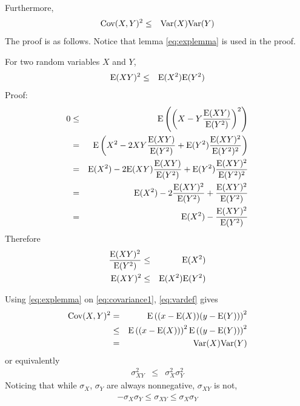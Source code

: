 Furthermore,
\begin{eqnarray}
  \textup{Cov}(X, Y)^2 &\leq& \textup{Var}(X)\textup{Var}(Y) \nonumber
\end{eqnarray}
The proof is as follows. Notice that lemma \eqref{eq:explemma} is used in the proof.
\begin{mdframed}[frametitle={Lemma}]

For two random variables $X$ and $Y$,
\begin{eqnarray}
	\textup{E}(XY)^2 &\leq&  \textup{E}(X^2)\textup{E}(Y^2) \label{eq:explemma}
\end{eqnarray}
\noindent Proof:
\begin{eqnarray}
	0 &\leq& \textup{E}\left(\left(X-Y\dfrac{\textup{E}(XY)}{\textup{E}(Y^2)}\right)^2\right) \nonumber \\
	&=& \textup{E}\left(X^2-2XY\dfrac{\textup{E}(XY)}{\textup{E}(Y^2)}+\textup{E}(Y^2)\dfrac{\textup{E}(XY)^2}{\textup{E}(Y^2)^2}\right) \nonumber \\
	&=& \textup{E}(X^2) - 2\textup{E}(XY)\dfrac{\textup{E}(XY)}{\textup{E}(Y^2)} + \textup{E}(Y^2)\dfrac{\textup{E}(XY)^2}{\textup{E}(Y^2)^2} \nonumber \\
	&=& \textup{E}(X^2) - 2\dfrac{\textup{E}(XY)^2}{\textup{E}(Y^2)} + \dfrac{\textup{E}(XY)^2}{\textup{E}(Y^2)} \nonumber \\
	&=& \textup{E}(X^2) - \dfrac{\textup{E}(XY)^2}{\textup{E}(Y^2)} \nonumber
\end{eqnarray}
Therefore
\begin{eqnarray}
	\dfrac{\textup{E}(XY)^2}{\textup{E}(Y^2)} &\leq& \textup{E}(X^2) \nonumber \\
	\textup{E}(XY)^2 &\leq&  \textup{E}(X^2)\textup{E}(Y^2) \nonumber
\end{eqnarray}
\end{mdframed}
Using \eqref{eq:explemma} on \eqref{eq:covariance1}, \eqref{eq:vardef} gives
\begin{eqnarray}
	\textup{Cov}(X, Y)^2 &=& \textup{E}\left((x - \textup{E}(X))(y - \textup{E}(Y))\right)^2 \nonumber \\
	&\leq& \textup{E}\left((x - \textup{E}(X))\right)^2\textup{E}\left((y - \textup{E}(Y))\right)^2 \nonumber \\
	&=& \textup{Var}(X)\textup{Var}(Y) \nonumber
\end{eqnarray}
or equivalently
\begin{eqnarray}
	\sigma_{XY}^2 &\leq& \sigma_X^2\sigma_Y^2 \nonumber
\end{eqnarray}
Noticing that while $\sigma_X$, $\sigma_Y$ are always nonnegative, $\sigma_{XY}$ is not,
\begin{eqnarray}
	-\sigma_X\sigma_Y \leq \sigma_{XY} \leq \sigma_X\sigma_Y \label{eq:covlemma}
\end{eqnarray}



